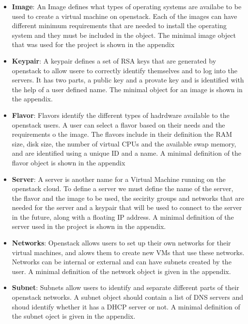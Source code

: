 \begin{itemize}
\item \textbf{Image}: An Image defines what types of operating systems are
availabe to be used to create a virtual machine on openstack. Each of
the images can have different minimum requirements that are needed to
install the operating system and they must be included in the
object. The minimal image object that was used for the project is
shown in the appendix

\item \textbf{Keypair}: A keypair defines a set of RSA keys that are
generated by openstack to allow usere to correctly identify themselves
and to log into the servers. It has two parts, a public key and a
provate key and is identified with the help of a user defined
name. The minimal object for an image is shown in the appendix.

\item \textbf{Flavor}: Flavors identify the different types of hadrdware
available to the openstack users. A user can select a flavor based on
their needs and the requirements o the image. The flavors include in
their definition the RAM size, disk size, the number of virtual CPUs
and the available swap memory, and are identified using a unique ID
and a name.  A minimal definition of the flavor object is shown in the
appendix

\item \textbf{Server}: A server is another name for a Virtual Machine
running on the openstack cloud. To define a server we must define the
name of the server, the flavor and the image to be used, the secirity
groups and networks that are needed for the server and a keypair that
will be used to connect to the server in the future, along with a
floating IP address. A minimal definition of the server used in the
project is shown in the appendix.

\item \textbf{Networks}: Openstack allows users to set up their own
networks for their virtual machines, and alows them to create new VMs
that use these networks. Networks can be internal or external and can
have subnets created by the user. A minimal definition of the network
object is given in the appendix.

\item \textbf{Subnet}: Subnets allow users to identify and separate
different parts of their openstack networks. A subnet object should
contain a list of DNS servers and shoud identify whether it has a DHCP
server or not.  A minimal definition of the subnet oject is given in
the appendix.
\end{itemize}

